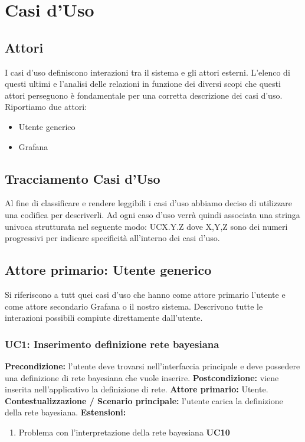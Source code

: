 \section{Casi d'Uso}
		\subsection{Attori}			
        I casi d'uso definiscono interazioni tra il sistema e gli attori esterni. L'elenco di questi ultimi e l'analisi delle relazioni in funzione dei diversi scopi che questi attori perseguono è fondamentale per una corretta descrizione dei casi d'uso.
        Riportiamo due attori:
        \begin{itemize}
            \item Utente generico
            \item Grafana
        \end{itemize}


		\subsection{Tracciamento Casi d'Uso}
        Al fine di classificare e rendere leggibili i casi d'uso abbiamo deciso di utilizzare una codifica per descriverli. Ad ogni caso d'uso verrà quindi associata una stringa univoca strutturata nel seguente modo: UCX.Y.Z  dove X,Y,Z sono dei numeri progressivi per indicare specificità all'interno dei casi d'uso.

		\subsection{Attore primario: Utente generico}
		Si riferiscono a tutt quei casi d'uso che hanno come attore primario l'utente e come attore secondario Grafana o il nostro sistema. Descrivono tutte le interazioni possibili compiute direttamente dall'utente.
				\subsubsection{UC1: Inserimento definizione rete bayesiana}
                    \textbf{Precondizione:} l’utente deve trovarsi nell’interfaccia principale e deve possedere una definizione di rete bayesiana che vuole inserire.
                    \newline
                    \textbf{Postcondizione:} viene inserita nell’applicativo la definizione di rete.
                    \newline
                    \textbf{Attore primario:} Utente.
                    \newline
                    \textbf{Contestualizzazione / Scenario principale:} l’utente carica la definizione della rete bayesiana.
                    \newline
                    \textbf{Estensioni:} \begin{enumerate}
                            \item Problema con l’interpretazione della rete bayesiana \textbf{UC10}
                        \end{enumerate}
                        
